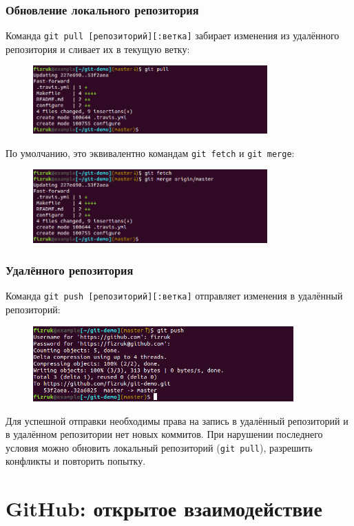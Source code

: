 \documentclass{beamer}
\begin{document}
\begin{frame}
  \frametitle{Обновление локального репозитория}
  Команда \texttt{git pull [репозиторий][:ветка]} забирает изменения из 
  удалённого репозитория и сливает их в текущую ветку:

  \begin{figure}
    \includegraphics[width=9cm]{images/git-pull.png}
  \end{figure}

  По умолчанию, это эквивалентно командам \texttt{git fetch} и \texttt{git merge}:

  \begin{figure}
    \includegraphics[width=9cm]{images/git-fetch-merge.png}
  \end{figure}
\end{frame}

\begin{frame}
  \frametitle{Удалённого репозитория}
  Команда \texttt{git push [репозиторий][:ветка]} отправляет
  изменения в удалённый репозиторий:

  \begin{figure}
    \includegraphics[width=10cm]{images/git-push.png}
  \end{figure}

  Для успешной отправки необходимы права на запись в удалённый репозиторий и в удалённом
  репозитории нет новых коммитов. При нарушении последнего условия можно обновить локальный
  репозиторий (\texttt{git pull}), разрешить конфликты и повторить попытку.
\end{frame}

\section{GitHub: открытое взаимодействие}
\end{document}
